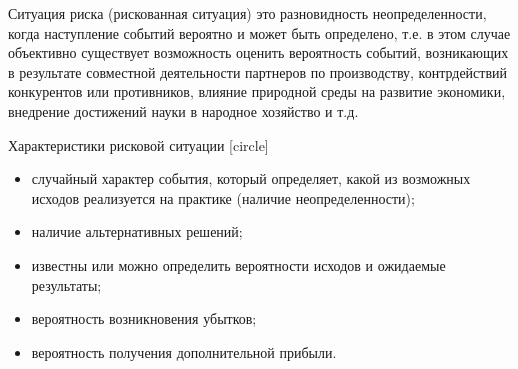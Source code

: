 \documentclass[financial_risks_lectures.tex]{subfiles}
\begin{document}
\begin{frame}{}
  \begin{block}{Ситуация риска (рискованная ситуация)}
  это разновидность неопределенности, когда наступление событий вероятно и может быть определено, т.е. в этом случае объективно существует возможность оценить вероятность событий, возникающих в результате совместной деятельности партнеров по производству, контрдействий конкурентов или противников, влияние природной среды на развитие экономики, внедрение достижений науки в народное хозяйство и т.д.
  \end{block}
\end{frame}

\begin{frame}{Характеристики рисковой ситуации}
[circle]
  	\begin{itemize}[<+->]
	  \item
		случайный характер события, который определяет, какой из возможных исходов реализуется на практике (наличие неопределенности);
	  \item
		наличие альтернативных решений;
	  \item
		известны или можно определить вероятности исходов и ожидаемые результаты;
	  \item
		вероятность возникновения убытков;
	  \item
		вероятность получения дополнительной прибыли.
  \end{itemize}
\end{frame}
\end{document}
